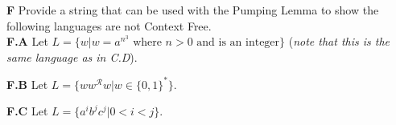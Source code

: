 \documentclass[10pt]{article}
\begin{document}
    \newpage
    \noindent
    \textbf{F} Provide a string that can be used with the Pumping Lemma to show the following languages are not Context Free.\\
    \textbf{F.A} Let $L=\{w|w=a^{n^3} \text{ where } n>0\text{ and is an integer}\}$ (\textit{note that this is the same language as in C.D}).



    \noindent
    \textbf{F.B} Let $L=\{ww^\mathcal{R}w|w\in\{0,1\}^*\}$.



    \noindent
    \textbf{F.C} Let $L=\{a^ib^jc^j|0<i<j\}$.


\end{document}
